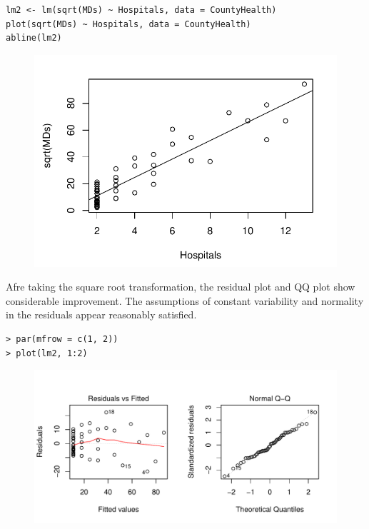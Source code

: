 \documentclass[10pt]{beamer}
\begin{document}
\begin{frame}[fragile]
\begin{verbatim}
lm2 <- lm(sqrt(MDs) ~ Hospitals, data = CountyHealth)
plot(sqrt(MDs) ~ Hospitals, data = CountyHealth)
abline(lm2)
\end{verbatim}
\begin{figure}
\includegraphics[scale=0.6]{figure/MDs_scatter2.pdf}
\end{figure}
\end{frame}

\begin{frame}[fragile]
Afre taking the square root transformation, the residual plot and QQ plot show considerable improvement.  The assumptions of constant variability and normality in the residuals appear reasonably satisfied.
\begin{verbatim}
> par(mfrow = c(1, 2))
> plot(lm2, 1:2)
\end{verbatim}
\begin{figure}
\includegraphics[scale=0.55]{figure/diagnostic2.pdf}
\end{figure}
\end{frame}
\end{document}

